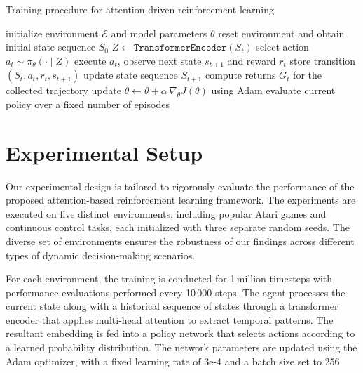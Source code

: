 \documentclass{article}
\begin{document}
\begin{algorithm}[H]
    \caption{Training procedure for attention-driven reinforcement learning}
    \begin{algorithmic}[1]
        \State initialize environment $\mathcal{E}$ and model parameters $\theta$
            \State reset environment and obtain initial state sequence $S_{0}$
                \State $Z \leftarrow \texttt{TransformerEncoder}(S_{t})$ 
                \State select action $a_{t} \sim \pi_{\theta}(\cdot\mid Z)$
                \State execute $a_{t}$, observe next state $s_{t+1}$ and reward $r_{t}$
                \State store transition $(S_{t}, a_{t}, r_{t}, s_{t+1})$
                \State update state sequence $S_{t+1}$
            \EndWhile
            \State compute returns $G_{t}$ for the collected trajectory
            \State update $\theta \leftarrow \theta + \alpha\,\nabla_{\theta} J(\theta)$ using Adam
                \State evaluate current policy over a fixed number of episodes
            \EndIf
        \EndFor
    \end{algorithmic}
\end{algorithm}

\section{Experimental Setup}
Our experimental design is tailored to rigorously evaluate the performance of the proposed attention-based reinforcement learning framework. The experiments are executed on five distinct environments, including popular Atari games and continuous control tasks, each initialized with three separate random seeds. The diverse set of environments ensures the robustness of our findings across different types of dynamic decision-making scenarios. 

For each environment, the training is conducted for 1\,million timesteps with performance evaluations performed every 10\,000 steps. The agent processes the current state along with a historical sequence of states through a transformer encoder that applies multi-head attention to extract temporal patterns. The resultant embedding is fed into a policy network that selects actions according to a learned probability distribution. The network parameters are updated using the Adam optimizer, with a fixed learning rate of 3e-4 and a batch size set to 256. 
\end{document}
